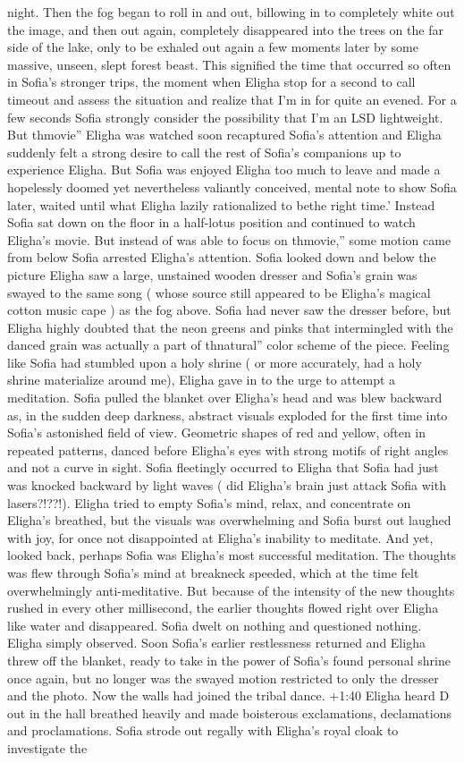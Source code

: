 \documentclass[12pt]{book}
\begin{document}
night. Then the fog began to roll in and out, billowing in to completely white out the image, and then out again, completely disappeared into the trees on the far side of the lake, only to be exhaled out again a few moments later by some massive, unseen, slept forest beast. This signified the time that occurred so often in Sofia's stronger trips, the moment when Eligha stop for a second to call timeout and assess the situation and realize that I'm in for quite an evened. For a few seconds Sofia strongly consider the possibility that I'm an LSD lightweight. But thmovie'' Eligha was watched soon recaptured Sofia's attention and Eligha suddenly felt a strong desire to call the rest of Sofia's companions up to experience Eligha. But Sofia was enjoyed Eligha too much to leave and made a hopelessly doomed yet nevertheless valiantly conceived, mental note to show Sofia later, waited until what Eligha lazily rationalized to bethe right time.' Instead Sofia sat down on the floor in a half-lotus position and continued to watch Eligha's movie. But instead of was able to focus on thmovie,'' some motion came from below Sofia arrested Eligha's attention. Sofia looked down and below the picture Eligha saw a large, unstained wooden dresser and Sofia's grain was swayed to the same song ( whose source still appeared to be Eligha's magical cotton music cape ) as the fog above. Sofia had never saw the dresser before, but Eligha highly doubted that the neon greens and pinks that intermingled with the danced grain was actually a part of thnatural'' color scheme of the piece. Feeling like Sofia had stumbled upon a holy shrine ( or more accurately, had a holy shrine materialize around me), Eligha gave in to the urge to attempt a meditation. Sofia pulled the blanket over Eligha's head and was blew backward as, in the sudden deep darkness, abstract visuals exploded for the first time into Sofia's astonished field of view. Geometric shapes of red and yellow, often in repeated patterns, danced before Eligha's eyes with strong motifs of right angles and not a curve in sight. Sofia fleetingly occurred to Eligha that Sofia had just was knocked backward by light waves ( did Eligha's brain just attack Sofia with lasers?!??!). Eligha tried to empty Sofia's mind, relax, and concentrate on Eligha's breathed, but the visuals was overwhelming and Sofia burst out laughed with joy, for once not disappointed at Eligha's inability to meditate. And yet, looked back, perhaps Sofia was Eligha's most successful meditation. The thoughts was flew through Sofia's mind at breakneck speeded, which at the time felt overwhelmingly anti-meditative. But because of the intensity of the new thoughts rushed in every other millisecond, the earlier thoughts flowed right over Eligha like water and disappeared. Sofia dwelt on nothing and questioned nothing. Eligha simply observed. Soon Sofia's earlier restlessness returned and Eligha threw off the blanket, ready to take in the power of Sofia's found personal shrine once again, but no longer was the swayed motion restricted to only the dresser and the photo. Now the walls had joined the tribal dance. +1:40 Eligha heard D out in the hall breathed heavily and made boisterous exclamations, declamations and proclamations. Sofia strode out regally with Eligha's royal cloak to investigate the 
\end{document}
